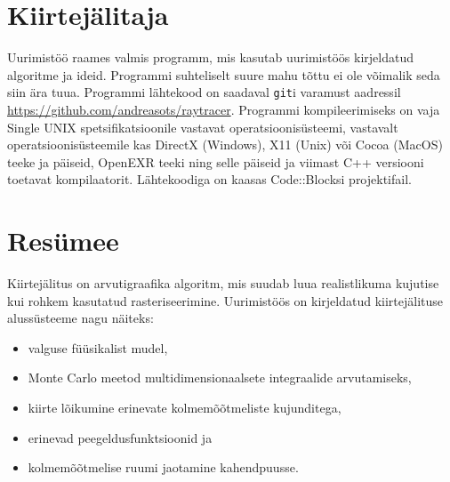 \documentclass[a4paper,12pt]{report}
\begin{document}
\appendix
\chapter{Kiirtejälitaja} \label{chap:download}
Uurimistöö raames valmis programm, mis kasutab uurimistöös kirjeldatud
algoritme ja ideid. Programmi suhteliselt suure mahu tõttu ei ole võimalik
seda siin ära tuua. Programmi lähtekood on saadaval \texttt{git}i varamust
aadressil \url{https://github.com/andreasots/raytracer}. Programmi kompileerimiseks
on vaja Single UNIX spetsifikatsioonile vastavat operatsioonisüsteemi,
vastavalt operatsioonisüsteemile kas DirectX (Windows), X11 (Unix) või
Cocoa (MacOS) teeke ja päiseid, OpenEXR teeki ning selle päiseid ja
viimast C++ versiooni toetavat kompilaatorit. Lähtekoodiga on kaasas
Code::Blocksi projektifail.

\chapter*{Resümee}
Kiirtejälitus on arvutigraafika algoritm, mis suudab luua realistlikuma
kujutise kui rohkem kasutatud rasteriseerimine. Uurimistöös on kirjeldatud
kiirtejälituse alussüsteeme nagu näiteks:
\begin{itemize}
\item valguse füüsikalist mudel,
\item Monte Carlo meetod multidimensionaalsete integraalide arvutamiseks,
\item kiirte lõikumine erinevate kolmemõõtmeliste kujunditega,
\item erinevad peegeldusfunktsioonid ja
\item kolmemõõtmelise ruumi jaotamine kahendpuusse.
\end{itemize}
\end{document}
